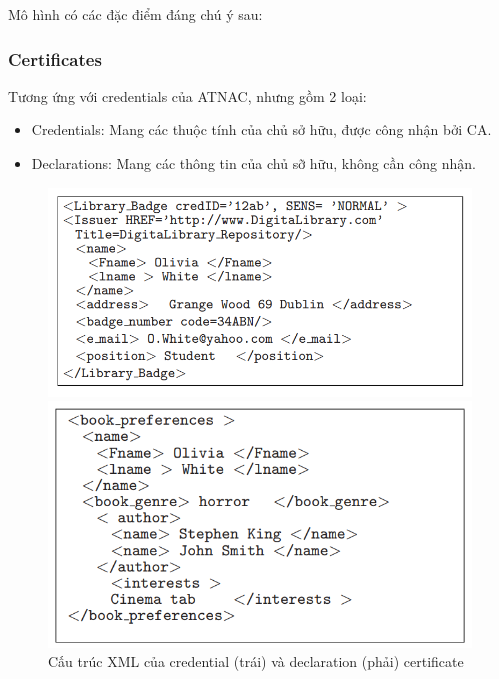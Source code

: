 \documentclass[12pt]{article}
\begin{document}
Mô hình có các đặc điểm đáng chú ý sau:

\subsubsection{Certificates}
Tương ứng với credentials của ATNAC, nhưng gồm 2 loại:
\begin{itemize}
\item Credentials: Mang các thuộc tính của chủ sở hữu, được công nhận bởi CA.
\item Declarations: Mang các thông tin của chủ sỡ hữu, không cần công nhận.
\end{itemize}

\begin{figure}[H]
\centering
\begin{multicols}{2}
\includegraphics[scale=.5]{img/trustx-credential.PNG}

\includegraphics[scale=.5]{img/trustx-declaration.PNG}
\end{multicols}
\caption{Cấu trúc XML của credential (trái) và declaration (phải) certificate}
\end{figure}
\end{document}
